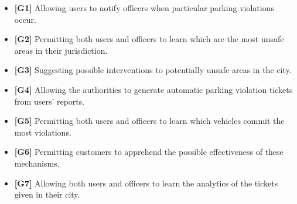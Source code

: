 \begin{itemize}

\item \textbf{[\hypertarget{G1}{G1}]} Allowing users to notify officers when particular parking violations occur.

\item \textbf{[\hypertarget{G2}{G2}]} Permitting both users and officers to learn which are the most unsafe areas in their jurisdiction.

\item \textbf{[\hypertarget{G3}{G3}]} Suggesting possible interventions to potentially unsafe areas in the city.

\item \textbf{[\hypertarget{G4}{G4}]} Allowing the authorities to generate automatic parking violation tickets from users' reports.

\item \textbf{[\hypertarget{G5}{G5}]} Permitting both users and officers to learn which vehicles commit the most violations.

\item \textbf{[\hypertarget{G6}{G6}]} Permitting customers to apprehend the possible effectiveness of these mechanisms.

\item \textbf{[\hypertarget{G7}{G7}]} Allowing both users and officers to learn the analytics of the tickets given in their city.

\end{itemize}